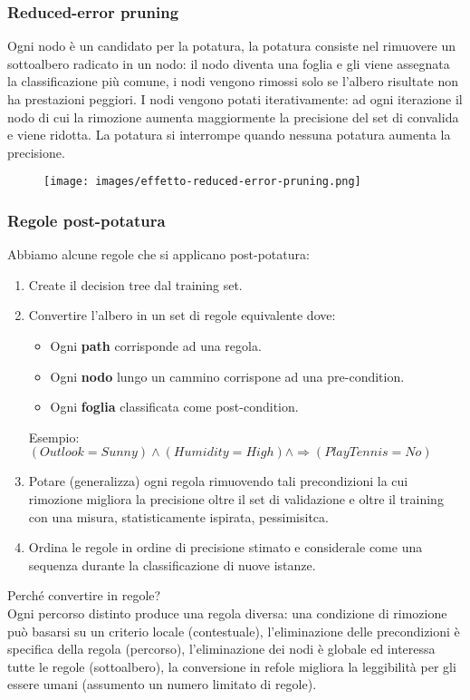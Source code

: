 \subsubsection{Reduced-error pruning}
Ogni nodo è un candidato per la potatura, la potatura consiste nel rimuovere un sottoalbero radicato in un nodo: il nodo diventa una foglia e gli
viene assegnata la classificazione più comune, i nodi vengono rimossi solo se l'albero risultate non ha prestazioni peggiori. I nodi vengono potati iterativamente:
ad ogni iterazione il nodo di cui la rimozione aumenta maggiormente la precisione del set di convalida e viene ridotta. La potatura si interrompe quando nessuna potatura aumenta la precisione.
\begin{figure}[h!]
    \centering
    \texttt{[image: images/effetto-reduced-error-pruning.png]}
\end{figure}

\subsubsection{Regole post-potatura}
Abbiamo alcune regole che si applicano post-potatura:
\begin{enumerate}
    \item Create il decision tree dal training set.
    \item Convertire l'albero in un set di regole equivalente dove:
    \begin{itemize}
        \item Ogni \textbf{path} corrisponde ad una regola.
        \item Ogni \textbf{nodo} lungo un cammino corrispone ad una pre-condition.
        \item Ogni \textbf{foglia} classificata come post-condition.
    \end{itemize}
    Esempio: $(Outlook = Sunny) \land (Humidity = High) \land \Rightarrow (PlayTennis = No)$
    \item Potare (generalizza) ogni regola rimuovendo tali precondizioni la cui rimozione migliora la precisione oltre il set di validazione e oltre il training
    con una misura, statisticamente ispirata, pessimisitca.
    \item Ordina le regole in ordine di precisione stimato e considerale come una sequenza durante la classificazione di nuove istanze.
\end{enumerate}
Perché convertire in regole?\\
Ogni percorso distinto produce una regola diversa: una condizione di rimozione può basarsi su un criterio locale (contestuale),
l'eliminazione delle precondizioni è specifica della regola (percorso), l'eliminazione dei nodi è globale ed interessa tutte le regole (sottoalbero), 
la conversione in refole migliora la leggibilità per gli essere umani (assumento un numero limitato di regole).

